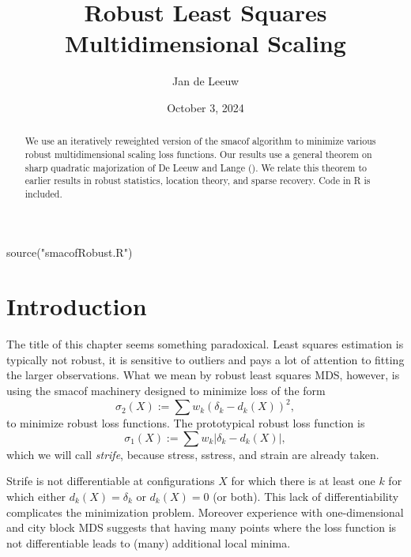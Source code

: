 \documentclass[
  12pt,
  letterpaper,
  DIV=11,
  numbers=noendperiod]{scrartcl}
\title{Robust Least Squares Multidimensional Scaling}
\author{Jan de Leeuw}
\date{October 3, 2024}
\newenvironment{Shaded}{\begin{snugshade}}{\end{snugshade}}
\newcommand{\FunctionTok}[1]{\textcolor[rgb]{0.28,0.35,0.67}{#1}}
\newcommand{\NormalTok}[1]{\textcolor[rgb]{0.00,0.23,0.31}{#1}}
\newcommand{\StringTok}[1]{\textcolor[rgb]{0.13,0.47,0.30}{#1}}
\newcommand{\sectionbreak}{\pagebreak}
\renewcommand*\contentsname{Table of contents}
\newcommand\contentsname{Table of contents}
\begin{document}
\maketitle
\begin{abstract}
We use an iteratively reweighted version of the smacof algorithm to
minimize various robust multidimensional scaling loss functions. Our
results use a general theorem on sharp quadratic majorization of De
Leeuw and Lange (). We relate
this theorem to earlier results in robust statistics, location theory,
and sparse recovery. Code in R is included.
\end{abstract}

\renewcommand*\contentsname{Table of contents}
{
\hypersetup{linkcolor=}
\setcounter{tocdepth}{3}
\tableofcontents
}

\sectionbreak

\begin{Shaded}
\begin{Highlighting}[]
\FunctionTok{source}\NormalTok{(}\StringTok{"smacofRobust.R"}\NormalTok{)}
\end{Highlighting}
\end{Shaded}

\section{Introduction}\label{introduction}

The title of this chapter seems something paradoxical. Least squares
estimation is typically not robust, it is sensitive to outliers and pays
a lot of attention to fitting the larger observations. What we mean by
robust least squares MDS, however, is using the smacof machinery
designed to minimize loss of the form \begin{equation}
\sigma_2(X):=\sum w_k(\delta_k-d_k(X))^2\label{eq:stressdef},
\end{equation} to minimize robust loss functions. The prototypical
robust loss function is \begin{equation}
\sigma_1(X):=\sum w_k|\delta_k-d_k(X)|\label{eq:stradddef},
\end{equation} which we will call \emph{strife}, because stress,
sstress, and strain are already taken.

Strife is not differentiable at configurations \(X\) for which there is
at least one \(k\) for which either \(d_k(X)=\delta_k\) or \(d_k(X)=0\)
(or both). This lack of differentiability complicates the minimization
problem. Moreover experience with one-dimensional and city block MDS
suggests that having many points where the loss function is not
differentiable leads to (many) additional local minima.
\end{document}
